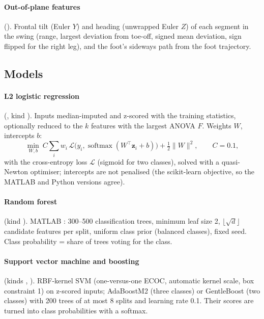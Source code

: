 \paragraph{Out-of-plane features} (). Frontal tilt (Euler $Y$) and heading (unwrapped Euler $Z$) of
each segment in the swing (range, largest deviation from toe-off, signed mean deviation, sign flipped for the right leg), and
the foot's sideways path from the foot trajectory.

\subsection{Models}
\label{sec:models}

\paragraph{L2 logistic regression} (, kind ). Inputs median-imputed and z-scored with the
training statistics, optionally reduced to the $k$ features with the largest ANOVA $F$. Weights $W$, intercepts $b$:
\begin{equation}
\min_{W,b}\ C \sum_i w_i\, \mathcal{L}\big(y_i, \operatorname{softmax}(W^\top \mathbf{z}_i + b)\big) + \tfrac12 \lVert W\rVert^2,
\qquad C = 0.1,
\end{equation}
with the cross-entropy loss $\mathcal{L}$ (sigmoid for two classes), solved with a quasi-Newton optimiser; intercepts are not
penalised (the scikit-learn objective, so the MATLAB and Python versions agree).

\paragraph{Random forest} (kind ). MATLAB : 300--500 classification trees, minimum leaf size 2,
$\lfloor\sqrt d\rfloor$ candidate features per split, uniform class prior (balanced classes), fixed seed. Class probability =
share of trees voting for the class.

\paragraph{Support vector machine and boosting} (kinds , ). RBF-kernel SVM (one-versus-one ECOC, automatic
kernel scale, box constraint 1) on z-scored inputs; AdaBoostM2 (three classes) or GentleBoost (two classes) with 200 trees
of at most 8 splits and learning rate 0.1. Their scores are turned into class probabilities with a softmax.

